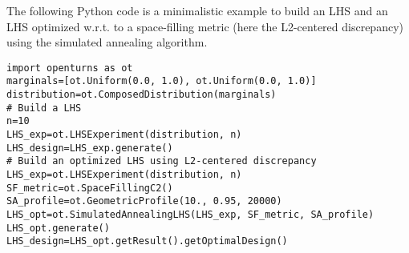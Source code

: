 \begin{otexample}
    The following Python code is a minimalistic \ot example to build an LHS and 
    an LHS optimized w.r.t. to a space-filling metric (here the L2-centered discrepancy) using the simulated annealing algorithm. 
    \lstset{style=mystyle, language=python}
%
\begin{lstlisting}
import openturns as ot
marginals=[ot.Uniform(0.0, 1.0), ot.Uniform(0.0, 1.0)]
distribution=ot.ComposedDistribution(marginals)
# Build a LHS
n=10
LHS_exp=ot.LHSExperiment(distribution, n)
LHS_design=LHS_exp.generate()
# Build an optimized LHS using L2-centered discrepancy
LHS_exp=ot.LHSExperiment(distribution, n)
SF_metric=ot.SpaceFillingC2()
SA_profile=ot.GeometricProfile(10., 0.95, 20000)
LHS_opt=ot.SimulatedAnnealingLHS(LHS_exp, SF_metric, SA_profile)
LHS_opt.generate()
LHS_design=LHS_opt.getResult().getOptimalDesign()
\end{lstlisting}
%
\end{otexample}


